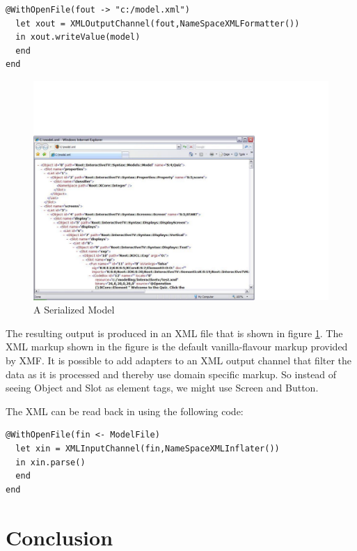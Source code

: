 \begin{lstlisting}
@WithOpenFile(fout -> "c:/model.xml")
  let xout = XMLOutputChannel(fout,NameSpaceXMLFormatter())
  in xout.writeValue(model)
  end
end
\end{lstlisting}%
\begin{figure}
\begin{center}

\includegraphics[width=12cm]{LanguageEngineering/Interactive/Images/Serialized}

\caption{A Serialized Model\label{fig:A-Serialized-Model}}

\end{center}
\end{figure}


The resulting output is produced in an XML file that is shown in figure
\ref{fig:A-Serialized-Model}. The XML markup shown in the figure
is the default vanilla-flavour markup provided by XMF. It is possible
to add adapters to an XML output channel that filter the data as it
is processed and thereby use domain specific markup. So instead of
seeing Object and Slot as element tags, we might use Screen and Button.

The XML can be read back in using the following code:

\begin{lstlisting}
@WithOpenFile(fin <- ModelFile)
  let xin = XMLInputChannel(fin,NameSpaceXMLInflater())
  in xin.parse()
  end
end
\end{lstlisting}
\section{Conclusion\label{sec:Conclusion}}

